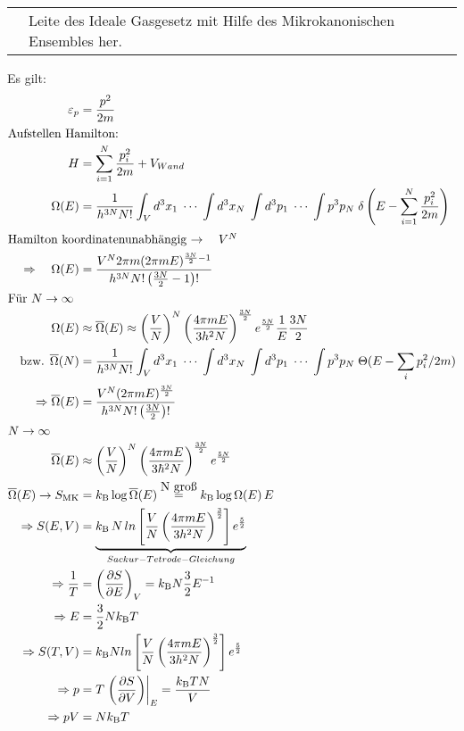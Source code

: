 \documentclass[a4paper,12pt]{scrartcl}
\makeatletter
\def\braket#1{\mathinner{\langle{#1}\rangle}}
\def\kB{k_\mathrm{B}}					%
\newcounter{qc}\setcounter{qc}{1}
\newenvironment{fshaded}{
\def\FrameCommand{\fcolorbox{framecolor}{shadecolor}}
\MakeFramed {\FrameRestore}}
{\endMakeFramed}
\def\frage#1{
\begin{fshaded}
\noindent
\begin{tabularx}{0.99\textwidth}{@{}c!{\color{framecolor}\vline}X}
{ \bf \rm \theqc }	&	\noindent #1
\end{tabularx}
\stepcounter{qc}
\end{fshaded}
}
\makeatother
\begin{document}
\frage{Leite des Ideale Gasgesetz mit Hilfe des Mikrokanonischen Ensembles her.}
\noindent
Es gilt:
\begin{align*}
\varepsilon_p&=\frac{p^2}{2m} \\
\intertext{Aufstellen Hamilton:}
 H&=\sum_{i=1}^{N} \frac{p_i^2}{2m}+V_{Wand} \\
 \Omega(E)&=\frac{1}{h^{3N}N!} \int_V d^3 x_1 \; \cdots \; \int d^3 x_N \; \int d^3 p_1 \; \cdots \; \int p^3 p_N \; \delta 
\left(E-\sum_{i=1}^{N} \frac{p_i^2}{2m} \right) \\
\intertext{Hamilton koordinatenunabhängig $\rightarrow \quad V^N$}
 \Rightarrow \quad \Omega(E)&=\frac {V^N 2 \pi m (2 \pi m E)^{\frac{3N}{2}-1} } {h^{3N}N! \left( \frac{3N}{2} -1 \right)! } \\
\intertext{Für $N\rightarrow \infty$}
 \Omega(E) &\approx \overline{\Omega}(E) \approx \left(\frac{V}{N} \right)^N \left( \frac{4 \pi m E}{3h^2 N} 
\right)^{\frac{3N}{2}}e^{\frac{5N}{2}}\frac{1}{E} \frac{3N}{2} \\
 \mbox{bzw. } \overline{\Omega}(N)&=\frac{1}{h^{3N}N!} \int_V d^3 x_1 \; \cdots \; \int d^3 x_N \; \int d^3 p_1 \; \cdots \; 
\int p^3 p_N \; \Theta(E-\sum_i p_i^2/2m) \\
 \Rightarrow \overline{\Omega}(E)&=\frac{V^N (2 \pi m E)^{\frac{3N}{2}}}{h^{3N}N!\left(\frac{3N}{2}\right)!} \\
\intertext{$N \rightarrow \infty$}
 \overline{\Omega}(E) &\approx \left( \frac{V}{N} \right)^N \left( \frac{4 \pi m E}{3 \hbar^2 N} 
\right)^{\frac{3N}{2}}e^{\frac{5N}{2}} \\
 \overline{\Omega}(E) \rightarrow S_\mathrm{MK}&=\kB  \log{\overline{\Omega}(E)} \stackrel{\mbox{N groß}}{=} \kB  \log{\Omega(E)\,E} \\
 \Rightarrow S(E,V)&=\underbrace{\kB \,N\,ln \left[ \frac{V}{N} \left( \frac{4 \pi m E}{3 h^2 N} \right)^{\frac{3}{2}} 
\right]e^{\frac{5}{2}}}_{Sackur-Tetrode-Gleichung} \\
 \Rightarrow \frac{1}{T}&=\left( \frac{\partial S}{\partial E} \right)_V = \kB  N \frac{3}{2} E^{-1} \\
 \Rightarrow E&=\frac{3}{2}N \kB  T \\
 \Rightarrow S(T,V)&=\kB  N ln \left[ \frac{V}{N} \left( \frac{4 \pi m E}{3 h^2 N} \right)^{\frac{3}{2}} \right] 
e^{\frac{5}{2}} \\
 \Rightarrow p&=T\left.\left( \frac{\partial S}{\partial V} \right)\right|_E = \frac{\kB  T N}{V} \\
 \Rightarrow pV&=N\kB  T
\end{align*}
\end{document}

